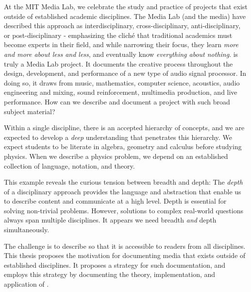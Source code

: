 At the MIT Media Lab, we celebrate the study and practice of projects
that exist outside of established academic disciplines. The Media Lab
(and the media) have described this approach as interdisciplinary,
cross-disciplinary, anti-disciplinary, or post-disciplinary -
emphasizing the clich\'{e} that traditional academics must become
experts in their field, and while narrowing their focus, they learn
\textit{more and more about less and less}, and eventually know
\textit{everything about nothing}.  \thesis is truly a Media Lab
project. It documents the creative process throughout the design,
development, and performance of a new type of audio signal
processor. In doing so, it draws from music, mathematics, computer
science, acoustics, audio engineering and mixing, sound reinforcement,
multimedia production, and live performance. How can we describe and
document a project with such broad subject material?  

Within a single discipline, there is an accepted hierarchy of concepts,
and we are expected to develop a \emph{deep} understanding that
penetrates this hierarchy. We expect students to be literate in
algebra, geometry and calculus before studying physics. When we
describe a physics problem, we depend on an established collection of
language, notation, and theory.

This example reveals the curious tension between breadth and depth:
The \textit{depth} of a disciplinary approach provides the language
and abstraction that enable us to describe content and communicate at
a high level. Depth is essential for solving non-trivial
problems. However, solutions to complex real-world questions always
span multiple disciplines. It appears we need breadth \emph{and}
depth simultaneously.

The challenge is to describe \thesis so that it is accessible to
readers from all disciplines. This thesis proposes the motivation for
documenting media that exists outside of established disciplines. It
proposes a strategy for such documentation, and employs this strategy
by documenting the theory, implementation, and application of \thesis.

